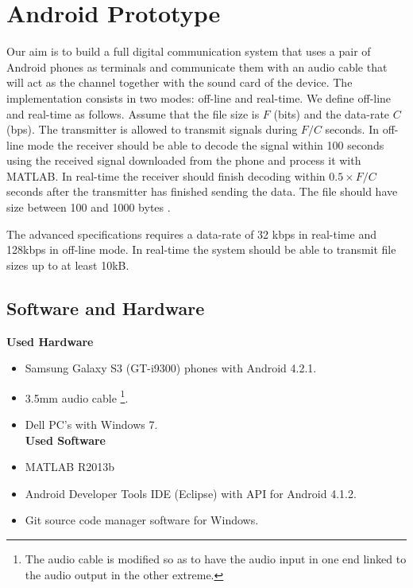 \documentclass[12pt,a4paper,openright]{report}
\begin{document}




\chapter{Android Prototype}

Our aim is to build a full digital communication system that uses a pair of Android phones as terminals and communicate them with an audio cable that will act as the channel together with the sound card of the device. The implementation consists in two modes: off-line and real-time. We define off-line and real-time as follows. Assume that the file size is $F$ (bits) and the data-rate $C$ (bps). The transmitter is allowed to transmit signals during $F/C$ seconds. In off-line mode the receiver should be able to decode the signal within 100 seconds using the received signal downloaded from the phone and process it with MATLAB. In real-time the receiver should finish decoding within $0.5\times F/C$ seconds after the transmitter has finished sending the data. The file should have size between 100 and 1000 bytes \cite{EQ2440ProjectDescription}.

The advanced specifications requires a data-rate of 32 kbps in real-time and 128kbps in off-line mode. In real-time the system should be able to transmit file sizes up to at least 10kB.


\section{Software and Hardware}


\textbf{Used Hardware}
\begin{itemize}
\item Samsung Galaxy S3 (GT-i9300) phones with Android 4.2.1.
\item 3.5mm audio cable {\color{Black}\footnote{The audio cable is modified so as to have the audio input in one end linked to the audio output in the other extreme.}}.
\item Dell PC's with Windows 7.
\\

\textbf{Used Software}
\item MATLAB R2013b 
\item Android Developer Tools IDE (Eclipse) with  API for Android 4.1.2. 
\item Git source code manager software for Windows.

\end{itemize}
\end{document}
